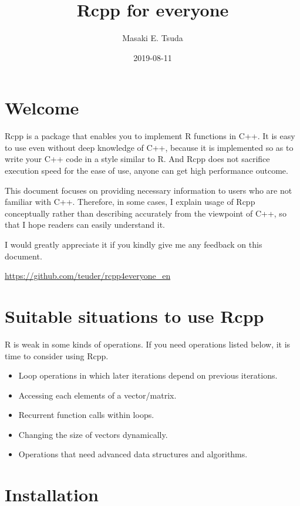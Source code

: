 \documentclass[]{book}
\title{Rcpp for everyone}
\author{Masaki E. Tsuda}
\date{2019-08-11}
\providecommand{\tightlist}{%
  \setlength{\itemsep}{0pt}\setlength{\parskip}{0pt}}
\begin{document}
\maketitle

{
\setcounter{tocdepth}{1}
\tableofcontents
}
\hypertarget{welcome}{%
\chapter*{Welcome}\label{welcome}}

Rcpp is a package that enables you to implement R functions in C++. It is easy to use even without deep knowledge of C++, because it is implemented so as to write your C++ code in a style similar to R. And Rcpp does not sacrifice execution speed for the ease of use, anyone can get high performance outcome.

This document focuses on providing necessary information to users who are not familiar with C++. Therefore, in some cases, I explain usage of Rcpp conceptually rather than describing accurately from the viewpoint of C++, so that I hope readers can easily understand it.

I would greatly appreciate it if you kindly give me any feedback on this document.

\url{https://github.com/teuder/rcpp4everyone_en}

\hypertarget{suitable-situations-to-use-rcpp}{%
\chapter{Suitable situations to use Rcpp}\label{suitable-situations-to-use-rcpp}}

R is weak in some kinds of operations. If you need operations listed below, it is time to consider using Rcpp.

\begin{itemize}
\tightlist
\item
  Loop operations in which later iterations depend on previous iterations.
\item
  Accessing each elements of a vector/matrix.
\item
  Recurrent function calls within loops.
\item
  Changing the size of vectors dynamically.
\item
  Operations that need advanced data structures and algorithms.
\end{itemize}

\hypertarget{installation}{%
\chapter{Installation}\label{installation}}
\end{document}
